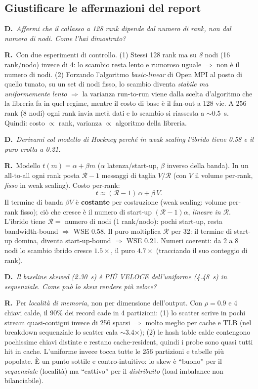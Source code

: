\documentclass[11pt,a4paper]{article}
\newcommand{\D}[1]{\begin{dom}\small\textbf{D.}\ \itshape #1\end{dom}}
\newcommand{\R}{\noindent\textbf{R.}\ }
\begin{document}
\subsection{Giustificare le affermazioni del report}

\D{Affermi che il collasso a 128 rank dipende dal numero di rank, non dal numero di nodi. Come l'hai dimostrato?}
\R Con due esperimenti di controllo. (1) Stessi 128 rank ma su \emph{8} nodi (16 rank/nodo) invece di 4: lo scambio resta lento e rumoroso uguale $\Rightarrow$ non è il numero di nodi. (2) Forzando l'algoritmo \emph{basic-linear} di Open MPI al posto di quello tunato, su un set di nodi fisso, lo scambio diventa \emph{stabile ma uniformemente lento} $\Rightarrow$ la varianza run-to-run viene dalla scelta d'algoritmo che la libreria fa in quel regime, mentre il costo di base è il fan-out a 128 vie. A 256 rank (8 nodi) ogni rank invia metà dati e lo scambio si riassesta a $\sim$0.5~s. Quindi: costo $\propto$ rank, varianza $\propto$ algoritmo della libreria.

\D{Derivami col modello di Hockney perché in weak scaling l'ibrido tiene 0.58 e il puro crolla a 0.21.}
\R Modello $t(m)=\alpha+\beta m$ ($\alpha$ latenza/start-up, $\beta$ inverso della banda). In un all-to-all ogni rank posta $\mathcal{R}-1$ messaggi di taglia $V/\mathcal{R}$ (con $V$ il volume per-rank, \emph{fisso} in weak scaling). Costo per-rank:
\[ t \approx (\mathcal{R}-1)\,\alpha + \beta\,V. \]
Il termine di banda $\beta V$ è \textbf{costante} per costruzione (weak scaling: volume per-rank fisso); ciò che cresce è il numero di start-up $(\mathcal{R}-1)\alpha$, \emph{lineare in $\mathcal{R}$}. L'ibrido tiene $\mathcal{R}=$ numero di nodi (1 rank/nodo): pochi start-up, resta bandwidth-bound $\Rightarrow$ WSE 0.58. Il puro moltiplica $\mathcal{R}$ per 32: il termine di start-up domina, diventa start-up-bound $\Rightarrow$ WSE 0.21. Numeri coerenti: da 2 a 8 nodi lo scambio ibrido cresce $1.5\times$, il puro $4.7\times$ (tracciando il suo conteggio di rank).

\D{Il baseline skewed (2.30~s) è PIÙ VELOCE dell'uniforme (4.48~s) in sequenziale. Come può lo skew rendere più veloce?}
\R Per \emph{località di memoria}, non per dimensione dell'output. Con $\rho=0.9$ e 4 chiavi calde, il 90\% dei record cade in 4 partizioni: (1) lo scatter scrive in pochi stream quasi-contigui invece di 256 sparsi $\Rightarrow$ molto meglio per cache e TLB (nel breakdown sequenziale lo scatter cala $\sim$3.4$\times$); (2) le hash table calde contengono pochissime chiavi distinte e restano cache-resident, quindi i probe sono quasi tutti hit in cache. L'uniforme invece tocca tutte le 256 partizioni e tabelle più popolate. È un punto sottile e contro-intuitivo: lo skew è ``buono'' per il \emph{sequenziale} (località) ma ``cattivo'' per il \emph{distribuito} (load imbalance non bilanciabile).
\end{document}
